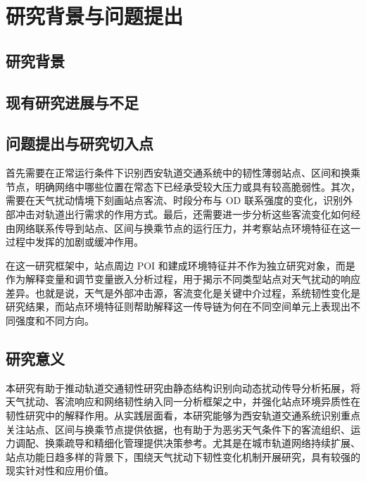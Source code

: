 \section{研究背景与问题提出}

\subsection{研究背景}


\subsection{现有研究进展与不足}



\subsection{问题提出与研究切入点}

首先需要在正常运行条件下识别西安轨道交通系统中的韧性薄弱站点、区间和换乘节点，明确网络中哪些位置在常态下已经承受较大压力或具有较高脆弱性。其次，需要在天气扰动情境下刻画站点客流、时段分布与 OD 联系强度的变化，识别外部冲击对轨道出行需求的作用方式。最后，还需要进一步分析这些客流变化如何经由网络联系传导到站点、区间与换乘节点的运行压力，并考察站点环境特征在这一过程中发挥的加剧或缓冲作用。

在这一研究框架中，站点周边 POI 和建成环境特征并不作为独立研究对象，而是作为解释变量和调节变量嵌入分析过程，用于揭示不同类型站点对天气扰动的响应差异。也就是说，天气是外部冲击源，客流变化是关键中介过程，系统韧性变化是研究结果，而站点环境特征则帮助解释这一传导链为何在不同空间单元上表现出不同强度和不同方向。

\subsection{研究意义}

本研究有助于推动轨道交通韧性研究由静态结构识别向动态扰动传导分析拓展，将天气扰动、客流响应和网络韧性纳入同一分析框架之中，并强化站点环境异质性在韧性研究中的解释作用。从实践层面看，本研究能够为西安轨道交通系统识别重点关注站点、区间与换乘节点提供依据，也有助于为恶劣天气条件下的客流组织、运力调配、换乘疏导和精细化管理提供决策参考。尤其是在城市轨道网络持续扩展、站点功能日趋多样的背景下，围绕天气扰动下韧性变化机制开展研究，具有较强的现实针对性和应用价值。
